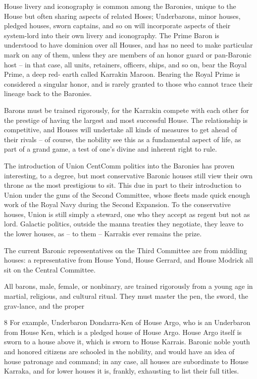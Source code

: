 House livery and iconography is common among the Baronies, unique to the House but often  
sharing aspects of related Hoses; Underbarons, minor houses, pledged houses, sworn captains,  
and so on will incorporate aspects of their system-lord into their own livery and iconography. The  
Prime Baron is understood to have dominion over all Houses, and has no need to make  
particular mark on any of them, unless they are members of an honor guard or pan-Baronic host  
-- in that case, all units, retainers, officers, ships, and so on, bear the Royal Prime, a deep red- 
earth called Karrakin Maroon. Bearing the Royal Prime is considered a singular honor, and is  
rarely granted to those who cannot trace their lineage back to the Baronies.   
 

Barons must be trained rigorously, for the Karrakin compete with each other for the prestige of  
having the largest and most successful House. The relationship is competitive, and Houses will  
undertake all kinds of measures to get ahead of their rivals -- of course, the nobility see this as a  
fundamental aspect of life, as part of a grand game, a test of one’s divine and inherent right to  
rule. 
 

The introduction of Union CentComm politics into the Baronies has proven interesting, to a  
degree, but most conservative Baronic houses still view their own throne as the most prestigious  
to sit. This due in part to their introduction to Union under the guns of the Second Committee,  
whose fleets made quick enough work of the Royal Navy during the Second Expansion. To the  
conservative houses, Union is still simply a steward, one who they accept as regent but not as  
lord. Galactic politics, outside the manna treaties they negotiate, they leave to the lower houses,  
as -- to them -- Karrakis ever remains the prize. 
 

The current Baronic representatives on the Third Committee are from middling houses: a  
representative from House Yond, House Gerrard, and House Modrick all sit on the Central  
Committee.    
 

All barons, male, female, or nonbinary, are trained rigorously from a young age in martial,  
religious, and cultural ritual. They must master the pen, the sword, the grav-lance, and the proper  

8 For example, Underbaron Dondarra-Ken of House Argo, who is an Underbaron from House Ken, which is  
a pledged house of House Argo. House Argo itself is sworn to a house above it, which is sworn to House  
Karrais. Baronic noble youth and honored citizens are schooled in the nobility, and would have an idea of  
house patronage and command; in any case, all houses are subordinate to House Karraka, and for lower  
houses it is, frankly, exhausting to list their full titles.  

